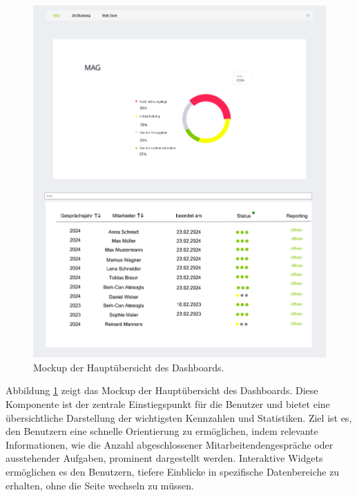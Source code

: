 \begin{figure}[h!]
    \centering
    \includegraphics[width=1.2\textwidth]{images/Dashboard.png}
    \caption{Mockup der Hauptübersicht des Dashboards.}
    \label{fig:mockup1}
\end{figure}
\noindent
Abbildung \ref{fig:mockup1} zeigt das Mockup der Hauptübersicht des Dashboards. Diese Komponente ist der zentrale Einstiegspunkt für die Benutzer und bietet eine übersichtliche Darstellung der wichtigsten Kennzahlen und Statistiken. Ziel ist es, den Benutzern eine schnelle Orientierung zu ermöglichen, indem relevante Informationen, wie die Anzahl abgeschlossener Mitarbeitendengespräche oder ausstehender Aufgaben, prominent dargestellt werden. Interaktive Widgets ermöglichen es den Benutzern, tiefere Einblicke in spezifische Datenbereiche zu erhalten, ohne die Seite wechseln zu müssen.


